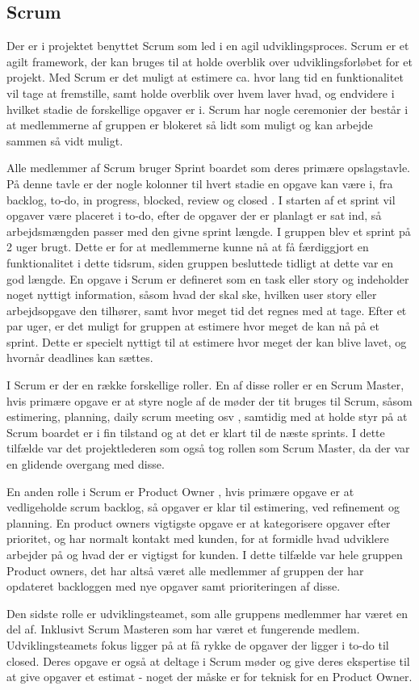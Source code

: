 \subsection{Scrum}

Der er i projektet benyttet Scrum som led i en agil udviklingsproces. Scrum er et agilt framework, der kan bruges til at holde overblik over udviklingsforløbet for et projekt. Med Scrum er det muligt at estimere ca. hvor lang tid en funktionalitet vil tage at fremstille, samt holde overblik over hvem laver hvad, og endvidere i hvilket stadie de forskellige opgaver er i. Scrum har nogle ceremonier der består i at medlemmerne af gruppen er blokeret så lidt som muligt og kan arbejde sammen så vidt muligt.

Alle medlemmer af Scrum bruger Sprint boardet \cite[Sprint board]{converge-terms} som deres primære opslagstavle. På denne tavle er der nogle kolonner til hvert stadie en opgave kan være i, fra backlog, to-do, in progress, blocked, review og closed \cite{atlassian}. I starten af et sprint vil opgaver være placeret i to-do, efter de opgaver der er planlagt er sat ind, så arbejdsmængden passer med den givne sprint længde. I gruppen blev et sprint på 2 uger brugt. Dette er for at medlemmerne kunne nå at få færdiggjort en funktionalitet i dette tidsrum, siden gruppen besluttede tidligt at dette var en god længde. En opgave i Scrum er defineret som en task eller story og indeholder noget nyttigt information, såsom hvad der skal ske, hvilken user story eller arbejdsopgave den tilhører, samt hvor meget tid det regnes med at tage. Efter et par uger, er det muligt for gruppen at estimere hvor meget de kan nå på et sprint. Dette er specielt nyttigt til at estimere hvor meget der kan blive lavet, og hvornår deadlines kan sættes.

I Scrum er der en række forskellige roller. En af disse roller er en Scrum Master, hvis primære opgave er at styre nogle af de møder der tit bruges til Scrum, såsom estimering, planning, daily scrum meeting osv \cite[Scrum Metting]{converge-terms}, samtidig med at holde styr på at Scrum boardet er i fin tilstand og at det er klart til de næste sprints. I dette tilfælde var det projektlederen som også tog rollen som Scrum Master, da der var en glidende overgang med disse.

En anden rolle i Scrum er Product Owner \cite[Product Owner]{converge-terms}, hvis primære opgave er at vedligeholde scrum backlog, så opgaver er klar til estimering, ved refinement \cite[Refinement]{converge-terms} og planning. En product owners vigtigste opgave er at kategorisere opgaver efter prioritet, og har normalt kontakt med kunden, for at formidle hvad udviklere arbejder på og hvad der er vigtigst for kunden. I dette tilfælde var hele gruppen Product owners, det har altså været alle medlemmer af gruppen der har opdateret backloggen med nye opgaver samt prioriteringen af disse.

Den sidste rolle er udviklingsteamet, som alle gruppens medlemmer har været en del af. Inklusivt Scrum Masteren som har været et fungerende medlem. Udviklingsteamets fokus ligger på at få rykke de opgaver der ligger i to-do til closed. Deres opgave er også at deltage i Scrum møder og give deres ekspertise til at give opgaver et estimat - noget der måske er for teknisk for en Product Owner.